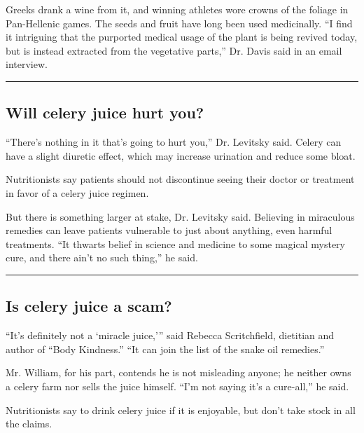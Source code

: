 Greeks drank a wine from it, and winning athletes wore crowns of the
foliage in Pan-Hellenic games. The seeds and fruit have long been used
medicinally. ``I find it intriguing that the purported medical usage of
the plant is being revived today, but is instead extracted from the
vegetative parts,'' Dr. Davis said in an email interview.

\begin{center}\rule{0.5\linewidth}{\linethickness}\end{center}

\hypertarget{will-celery-juice-hurt-you}{%
\subsection{Will celery juice hurt
you?}\label{will-celery-juice-hurt-you}}

``There's nothing in it that's going to hurt you,'' Dr. Levitsky said.
Celery can have a slight diuretic effect, which may increase urination
and reduce some bloat.

Nutritionists say patients should not discontinue seeing their doctor or
treatment in favor of a celery juice regimen.

But there is something larger at stake, Dr. Levitsky said. Believing in
miraculous remedies can leave patients vulnerable to just about
anything, even harmful treatments. ``It thwarts belief in science and
medicine to some magical mystery cure, and there ain't no such thing,''
he said.

\begin{center}\rule{0.5\linewidth}{\linethickness}\end{center}

\hypertarget{is-celery-juice-a-scam}{%
\subsection{Is celery juice a scam?}\label{is-celery-juice-a-scam}}

``It's definitely not a `miracle juice,''' said Rebecca Scritchfield,
dietitian and author of ``Body Kindness.'' ``It can join the list of the
snake oil remedies.''

Mr. William, for his part, contends he is not misleading anyone; he
neither owns a celery farm nor sells the juice himself. ``I'm not saying
it's a cure-all,'' he said.

Nutritionists say to drink celery juice if it is enjoyable, but don't
take stock in all the claims.

